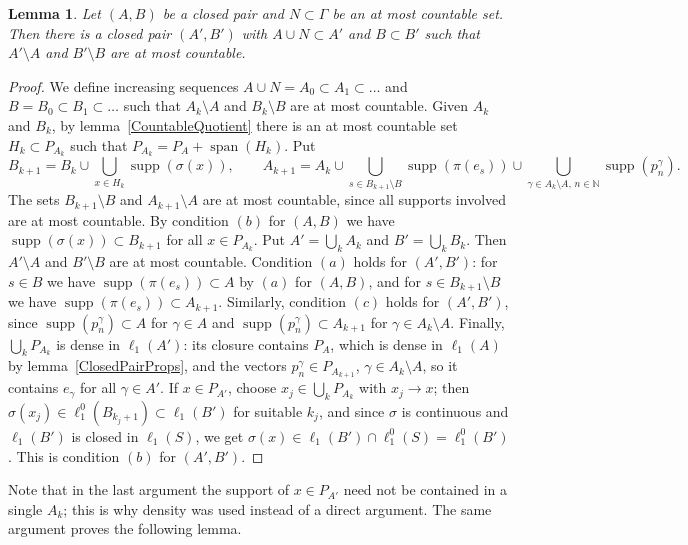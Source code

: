 \documentclass[12pt]{article}
\newtheorem{lemma}[theorem]{Lemma}
\newcommand{\lo}[1]{\ell_1^0(#1)}
\newcommand{\ellone}[1]{\ell_1(#1)}
\newcommand{\supp}{\operatorname{supp}}
\newcommand{\Lin}{\operatorname{span}}
\begin{document}
\begin{lemma}\label{CountableClosingOff} Let $(A,B)$ be a closed pair and
    $N\subset\Gamma$ be an at most countable set. Then there is a closed pair
    $(A',B')$ with $A\cup N\subset A'$ and $B\subset B'$ such that
    $A'\setminus A$ and $B'\setminus B$ are at most countable.
\end{lemma}
\begin{proof} We define increasing sequences $A\cup N=A_0\subset A_1\subset\ldots$
    and $B=B_0\subset B_1\subset\ldots$ such that $A_k\setminus A$ and
    $B_k\setminus B$ are at most countable. Given $A_k$ and $B_k$, by
    lemma~\ref{CountableQuotient} there is an at most countable set
    $H_k\subset P_{A_k}$ such that $P_{A_k}=P_A+\Lin(H_k)$. Put
    \[
    B_{k+1}=B_k\cup\bigcup_{x\in H_k}\supp(\sigma(x)),\qquad
    A_{k+1}=A_k\cup\bigcup_{s\in B_{k+1}\setminus B}\supp(\pi(e_s))
    \cup\bigcup_{\gamma\in A_k\setminus A,\,n\in\mathbb{N}}\supp(p^\gamma_n).
    \]
    The sets $B_{k+1}\setminus B$ and $A_{k+1}\setminus A$ are at most
    countable, since all supports involved are at most countable. By
    condition $(b)$ for $(A,B)$ we have $\supp(\sigma(x))\subset B_{k+1}$ for
    all $x\in P_{A_k}$. Put $A'=\bigcup_k A_k$ and $B'=\bigcup_k B_k$. Then
    $A'\setminus A$ and $B'\setminus B$ are at most countable. Condition
    $(a)$ holds for $(A',B')$: for $s\in B$ we have $\supp(\pi(e_s))\subset A$
    by $(a)$ for $(A,B)$, and for $s\in B_{k+1}\setminus B$ we have
    $\supp(\pi(e_s))\subset A_{k+1}$. Similarly, condition $(c)$ holds for
    $(A',B')$, since $\supp(p^\gamma_n)\subset A$ for $\gamma\in A$ and
    $\supp(p^\gamma_n)\subset A_{k+1}$ for $\gamma\in A_k\setminus A$.
    Finally, $\bigcup_k P_{A_k}$ is dense in $\ellone{A'}$: its closure
    contains $P_A$, which is dense in $\ellone{A}$ by
    lemma~\ref{ClosedPairProps}, and the vectors $p^\gamma_n\in P_{A_{k+1}}$,
    $\gamma\in A_k\setminus A$, so it contains $e_\gamma$ for all
    $\gamma\in A'$. If $x\in P_{A'}$, choose $x_j\in\bigcup_k P_{A_k}$ with
    $x_j\to x$; then $\sigma(x_j)\in\lo{B_{k_j+1}}\subset\ellone{B'}$ for
    suitable $k_j$, and since $\sigma$ is continuous and $\ellone{B'}$ is
    closed in $\ellone{S}$, we get $\sigma(x)\in\ellone{B'}\cap\lo{S}=\lo{B'}$.
    This is condition $(b)$ for $(A',B')$.
\end{proof}

Note that in the last argument the support of $x\in P_{A'}$ need not be
contained in a single $A_k$; this is why density was used instead of a
direct argument. The same argument proves the following lemma.
\end{document}
